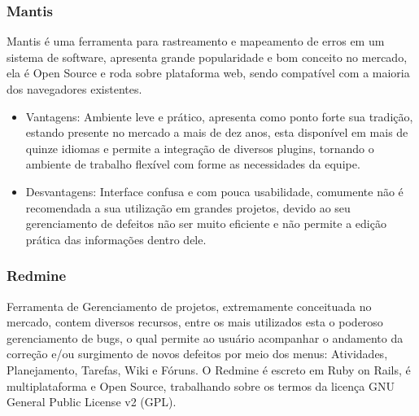 \documentclass[12pt,a4paper]{article}
\begin{document}
		\subsubsection{Mantis}
		
			Mantis é uma ferramenta para rastreamento e mapeamento de erros em um sistema de software, 
			apresenta grande popularidade e bom conceito no mercado, ela é Open Source e roda sobre plataforma web, 
			sendo compatível com a maioria dos navegadores existentes. 	

				\begin{itemize}
					\item Vantagens: 
						Ambiente leve e prático, apresenta como ponto forte sua tradição, estando presente no mercado a mais de dez anos, 
					  esta disponível em mais de quinze idiomas e permite a integração de diversos plugins, tornando o ambiente de trabalho flexível
					  com forme as necessidades da equipe. 					
					
					\item Desvantagens:
						Interface confusa e com pouca usabilidade, comumente não é recomendada a sua utilização em grandes projetos, 
						devido ao seu gerenciamento de defeitos não ser muito eficiente e não permite a edição prática das informações dentro dele. 
						
				\end{itemize}
						
		\subsubsection{Redmine}
		
			 Ferramenta de Gerenciamento de projetos, extremamente conceituada no mercado, contem diversos recursos, 
			 entre os mais utilizados esta o poderoso gerenciamento de bugs, o qual permite ao usuário acompanhar o 
			 andamento da correção e/ou surgimento de novos defeitos por meio dos menus: Atividades, Planejamento, Tarefas, Wiki e Fóruns.
			 O Redmine é escreto em Ruby on Rails, é multiplataforma e Open Source, trabalhando sobre os termos da licença GNU General Public License v2 (GPL).
			 
\end{document}
